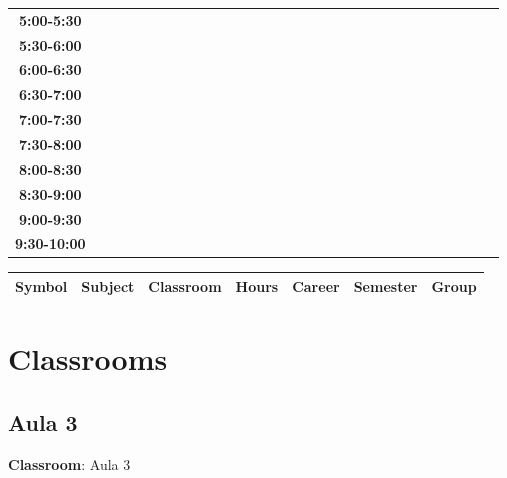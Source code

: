\documentclass{article}
\begin{document}
\begin{table}[ht]
\begin{tabular}{|c|c|c|c|c|c|c|c|c|c|c|c|c|c|c|c|c|c|c|c|c|c|c|c|c|c|c|c|c|c|}
\cline{1-8} 
\textbf{5:00-5:30} &   &   &   &   &   &   &   \\
\cline{1-8} 
\textbf{5:30-6:00} &   &   &   &   &   &   &   \\
\cline{1-8} 
\textbf{6:00-6:30} &   &   &   &   &   &   &   \\
\cline{1-8} 
\textbf{6:30-7:00} &   &   &   &   &   &   &   \\
\cline{1-8} 
\textbf{7:00-7:30} &   &   &   &   &   &   &   \\
\cline{1-8} 
\textbf{7:30-8:00} &   &   &   &   &   &   &   \\
\cline{1-8} 
\textbf{8:00-8:30} &   &   &   &   &   &   &   \\
\cline{1-8} 
\textbf{8:30-9:00} &   &   &   &   &   &   &   \\
\cline{1-8} 
\textbf{9:00-9:30} &   &   &   &   &   &   &   \\
\cline{1-8} 
\textbf{9:30-10:00} &   &   &   &   &   &   &   \\
\cline{1-8} 
\end{tabular}\end{table}


\begin{longtable}{|c|p{4cm}|c|c|c|c|c|}
\hline
\textbf{Symbol} & \textbf{Subject} & \textbf{Classroom} & \textbf{Hours} & \textbf{Career} & \textbf{Semester} & \textbf{Group} \\
\hline
\end{longtable}

\newpage



\section{Classrooms} 

\subsection{Aula 3}
\vspace*{.1cm}

\begin{flushright}
{\LARGE \textbf{Classroom}: Aula 3}
\end{flushright}
\vspace{1cm}
\end{document}
